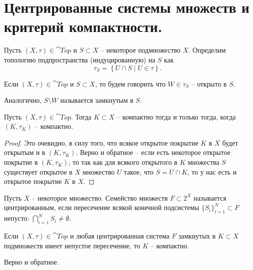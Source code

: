 \section{Центрированные системы множеств и критерий компактности.}
\begin{definition}
    Пусть $(X, \tau) \in \cat{Top}$ и $S \subset X$ -- некоторое подмножество $X$.
    Определим топологию подпространства (индуцированную) на $S$ как
    \[
        \tau_S = \left\{U \cap S \mid U \in \tau\right\}.
    \]
\end{definition}
\begin{definition}
    Если $(X, \tau) \in \cat{Top}$ и $S \subset X$, то будем говорить что $W \in \tau_S$ -- открыто в $S$.

    Аналогично, $S \setminus W$ называется замкнутым в $S$.
\end{definition}
\begin{proposition}
    Пусть $(X, \tau) \in \cat{Top}$.
    Тогда $K \subset X$ -- компактно тогда и только тогда, когда $(K, \tau_K)$ -- компактно.
\end{proposition}
\begin{proof}
    Это очевидно, в силу того, что всякое открытое покрытие $K$ в $X$ будет открытым и в $(K, \tau_K)$.
    Верно и обратное -- если есть некоторое открытое покрытие в $(K, \tau_K)$, то так как для всякого открытого в $K$ множества $S$ существует открытое в $X$ множество $U$ такое, что $S = U \cap K$, то у нас есть и открытое покрытие $K$ в $X$.
\end{proof}
\begin{definition}
    Пусть $X$ -- некоторое множество.
    Семейство множеств $F \subset 2^X$ называется центрированным, если пересечение всякой конечной подсистемы $\{S_i\}_{i = 1}^{N} \subset F$ непусто: $\bigcap_{i = 1}^{N} S_i \neq \emptyset$.
\end{definition}
\begin{proposition}
    Если $(X, \tau) \in \cat{Top}$ и любая центрированная система $F$ замкнутых в $K \subset X$ подмножеств имеет непустое пересечение, то $K$ -- компактно.

    Верно и обратное.
\end{proposition}

